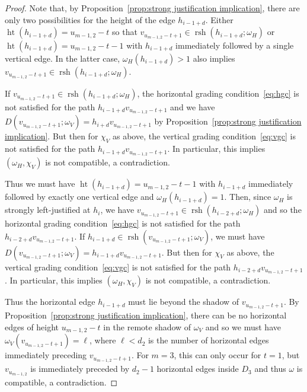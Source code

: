 \documentclass[ALCO,ThmDefs,Unicode,epreuves]{cedram}
\DeclareMathOperator{\hgt}{ht}
\DeclareMathOperator{\rsh}{rsh}
\begin{document}
\begin{proof}
 Note that, by Proposition~\ref{prop:strong justification implication}, there are only two possibilities for the height of the edge $h_{i-1+d}$.
 Either $\hgt(h_{i-1+d})=u_{m-1,2}-t$ so that $v_{u_{m-1,2}-t+1}\in\rsh(h_{i-1+d};\omega_H)$ or $\hgt(h_{i-1+d})=u_{m-1,2}-t-1$ with $h_{i-1+d}$ immediately followed by a single vertical edge.
 In the latter case, $\omega_H(h_{i-1+d})>1$ also implies $v_{u_{m-1,2}-t+1}\in\rsh(h_{i-1+d};\omega_H)$.

 If $v_{u_{m-1,2}-t+1}\in\rsh(h_{i-1+d};\omega_H)$, the horizontal grading condition~\eqref{eq:hgc} is not satisfied for the path $h_{i-1+d}v_{u_{m-1,2}-t+1}$ and we have $D(v_{u_{m-1,2}-t+1};\omega_V)=h_{i+d}v_{u_{m-1,2}-t+1}$ by Proposition~\ref{prop:strong justification implication}.
 But then for $\chi_V$ as above, the vertical grading condition~\eqref{eq:vgc} is not satisfied for the path $h_{i-1+d}v_{u_{m-1,2}-t+1}$.
 In particular, this implies $(\omega_H,\chi_V)$ is not compatible, a contradiction.

 Thus we must have $\hgt(h_{i-1+d})=u_{m-1,2}-t-1$ with $h_{i-1+d}$ immediately followed by exactly one vertical edge and $\omega_H(h_{i-1+d})=1$.
 Then, since $\omega_H$ is strongly left-justified at $h_i$, we have $v_{u_{m-1,2}-t+1}\in\rsh(h_{i-2+d};\omega_H)$ and so the horizontal grading condition~\eqref{eq:hgc} is not satisfied for the path $h_{i-2+d}v_{u_{m-1,2}-t+1}$.
 If $h_{i-1+d}\in\rsh(v_{u_{m-1,2}-t+1};\omega_V)$, we must have $D(v_{u_{m-1,2}-t+1};\omega_V)=h_{i-1+d}v_{u_{m-1,2}-t+1}$.
 But then for $\chi_V$ as above, the vertical grading condition~\eqref{eq:vgc} is not satisfied for the path $h_{i-2+d}v_{u_{m-1,2}-t+1}$.
 In particular, this implies $(\omega_H,\chi_V)$ is not compatible, a contradiction.

 Thus the horizontal edge $h_{i-1+d}$ must lie beyond the shadow of $v_{u_{m-1,2}-t+1}$.
 By Proposition~\ref{prop:strong justification implication}, there can be no horizontal edges of height $u_{m-1,2}-t$ in the remote shadow of $\omega_V$ and so we must have $\omega_V(v_{u_{m-1,2}-t+1})=\ell$, where $\ell<d_2$ is the number of horizontal edges immediately preceding $v_{u_{m-1,2}-t+1}$. 
 For $m=3$, this can only occur for $t=1$, but $v_{u_{m-1,2}}$ is immediately preceded by $d_2-1$ horizontal edges inside $D_3$ and thus $\omega$ is compatible, a contradiction.


\end{proof}
\end{document}

